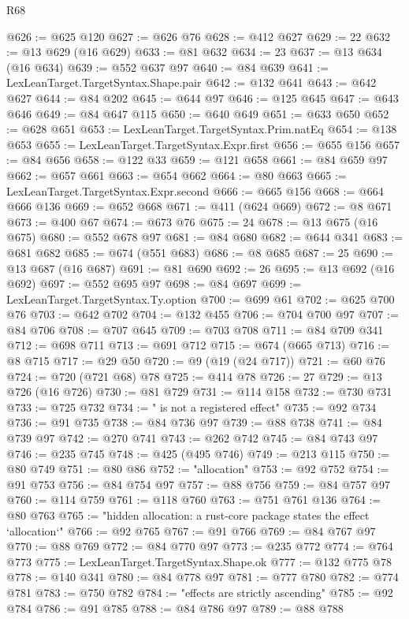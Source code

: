 \begin{lexlean}{R68}
\begin{coremodule}
@626 := @625 @120
@627 := @626 @76
@628 := @412 @627
@629 := 22
@632 := @13 @629 (@16 @629)
@633 := @81 @632
@634 := 23
@637 := @13 @634 (@16 @634)
@639 := @552 @637 @97
@640 := @84 @639
@641 := LexLeanTarget.TargetSyntax.Shape.pair
@642 := @132 @641
@643 := @642 @627
@644 := @84 @202
@645 := @644 @97
@646 := @125 @645
@647 := @643 @646
@649 := @84 @647 @115
@650 := @640 @649
@651 := @633 @650
@652 := @628 @651
@653 := LexLeanTarget.TargetSyntax.Prim.natEq
@654 := @138 @653
@655 := LexLeanTarget.TargetSyntax.Expr.first
@656 := @655 @156
@657 := @84 @656
@658 := @122 @33
@659 := @121 @658
@661 := @84 @659 @97
@662 := @657 @661
@663 := @654 @662
@664 := @80 @663
@665 := LexLeanTarget.TargetSyntax.Expr.second
@666 := @665 @156
@668 := @664 @666 @136
@669 := @652 @668
@671 := @411 (@624 @669)
@672 := @8 @671
@673 := @400 @67
@674 := @673 @76
@675 := 24
@678 := @13 @675 (@16 @675)
@680 := @552 @678 @97
@681 := @84 @680
@682 := @644 @341
@683 := @681 @682
@685 := @674 (@551 @683)
@686 := @8 @685
@687 := 25
@690 := @13 @687 (@16 @687)
@691 := @81 @690
@692 := 26
@695 := @13 @692 (@16 @692)
@697 := @552 @695 @97
@698 := @84 @697
@699 := LexLeanTarget.TargetSyntax.Ty.option
@700 := @699 @61
@702 := @625 @700 @76
@703 := @642 @702
@704 := @132 @455
@706 := @704 @700 @97
@707 := @84 @706
@708 := @707 @645
@709 := @703 @708
@711 := @84 @709 @341
@712 := @698 @711
@713 := @691 @712
@715 := @674 (@665 @713)
@716 := @8 @715
@717 := @29 @50
@720 := @9 (@19 (@24 @717))
@721 := @60 @76
@724 := @720 (@721 @68) @78
@725 := @414 @78
@726 := 27
@729 := @13 @726 (@16 @726)
@730 := @81 @729
@731 := @114 @158
@732 := @730 @731
@733 := @725 @732
@734 := " is not a registered effect"
@735 := @92 @734
@736 := @91 @735
@738 := @84 @736 @97
@739 := @88 @738
@741 := @84 @739 @97
@742 := @270 @741
@743 := @262 @742
@745 := @84 @743 @97
@746 := @235 @745
@748 := @425 (@495 @746)
@749 := @213 @115
@750 := @80 @749
@751 := @80 @86
@752 := "allocation"
@753 := @92 @752
@754 := @91 @753
@756 := @84 @754 @97
@757 := @88 @756
@759 := @84 @757 @97
@760 := @114 @759
@761 := @118 @760
@763 := @751 @761 @136
@764 := @80 @763
@765 := "hidden allocation: a rust-core package states the effect `allocation`"
@766 := @92 @765
@767 := @91 @766
@769 := @84 @767 @97
@770 := @88 @769
@772 := @84 @770 @97
@773 := @235 @772
@774 := @764 @773
@775 := LexLeanTarget.TargetSyntax.Shape.ok
@777 := @132 @775 @78
@778 := @140 @341
@780 := @84 @778 @97
@781 := @777 @780
@782 := @774 @781
@783 := @750 @782
@784 := "effects are strictly ascending"
@785 := @92 @784
@786 := @91 @785
@788 := @84 @786 @97
@789 := @88 @788

\end{coremodule}
\end{lexlean}
